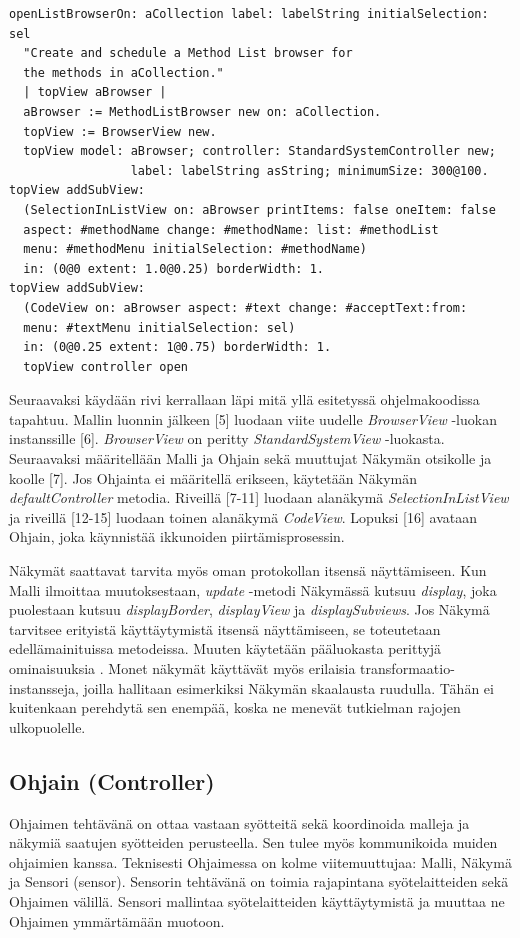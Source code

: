 \documentclass[utf8]{gradu3}
\begin{document}
\begin{lstlisting}[language=Smalltalk]
openListBrowserOn: aCollection label: labelString initialSelection: sel
  "Create and schedule a Method List browser for 
  the methods in aCollection."
  | topView aBrowser | 
  aBrowser := MethodListBrowser new on: aCollection.
  topView := BrowserView new.
  topView model: aBrowser; controller: StandardSystemController new;
                 label: labelString asString; minimumSize: 300@100.
topView addSubView:
  (SelectionInListView on: aBrowser printItems: false oneItem: false
  aspect: #methodName change: #methodName: list: #methodList
  menu: #methodMenu initialSelection: #methodName)
  in: (0@0 extent: 1.0@0.25) borderWidth: 1.
topView addSubView:
  (CodeView on: aBrowser aspect: #text change: #acceptText:from:
  menu: #textMenu initialSelection: sel)
  in: (0@0.25 extent: 1@0.75) borderWidth: 1.
  topView controller open
\end{lstlisting}

Seuraavaksi käydään rivi kerrallaan läpi mitä yllä esitetyssä ohjelmakoodissa tapahtuu. Mallin luonnin jälkeen [5] luodaan viite uudelle \textit{BrowserView} -luokan instanssille [6]. \textit{BrowserView} on peritty \textit{StandardSystemView} -luokasta. Seuraavaksi määritellään Malli ja Ohjain sekä muuttujat Näkymän otsikolle ja koolle [7]. Jos Ohjainta ei määritellä erikseen, käytetään Näkymän \textit{defaultController} metodia. Riveillä [7-11] luodaan alanäkymä \textit{SelectionInListView} ja riveillä [12-15] luodaan toinen alanäkymä \textit{CodeView}. Lopuksi [16] avataan Ohjain, joka käynnistää ikkunoiden piirtämisprosessin.

Näkymät saattavat tarvita myös oman protokollan itsensä näyttämiseen. Kun Malli ilmoittaa muutoksestaan, \textit{update} -metodi Näkymässä kutsuu \textit{display}, joka puolestaan kutsuu \textit{displayBorder}, \textit{displayView} ja \textit{displaySubviews}. Jos Näkymä tarvitsee erityistä käyttäytymistä itsensä näyttämiseen, se toteutetaan edellämainituissa metodeissa. Muuten käytetään pääluokasta perittyjä ominaisuuksia \parencite{burbeck}. Monet näkymät käyttävät myös erilaisia transformaatio-instansseja, joilla hallitaan esimerkiksi Näkymän skaalausta ruudulla. Tähän ei kuitenkaan perehdytä sen enempää, koska ne menevät tutkielman rajojen ulkopuolelle.


\subsection{Ohjain (Controller)}
Ohjaimen tehtävänä on ottaa vastaan syötteitä sekä koordinoida malleja ja näkymiä saatujen syötteiden perusteella. Sen tulee myös kommunikoida muiden ohjaimien kanssa. Teknisesti Ohjaimessa on kolme viitemuuttujaa: Malli, Näkymä ja Sensori (sensor). Sensorin tehtävänä on toimia rajapintana syötelaitteiden sekä Ohjaimen välillä. Sensori mallintaa syötelaitteiden käyttäytymistä ja muuttaa ne Ohjaimen ymmärtämään muotoon.
\end{document}
